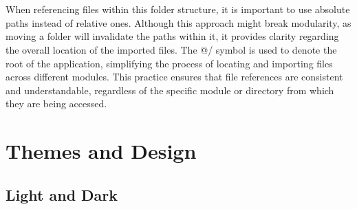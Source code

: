 \\\\
\noindent When referencing files within this folder structure, it is important to use absolute paths instead of relative ones. Although this approach might break modularity, as moving a folder will invalidate the paths within it, it provides clarity regarding the overall location of the imported files. The @/ symbol is used to denote the root of the application, simplifying the process of locating and importing files across different modules. This practice ensures that file references are consistent and understandable, regardless of the specific module or directory from which they are being accessed.

\section{Themes and Design}

\subsection{Light and Dark}

